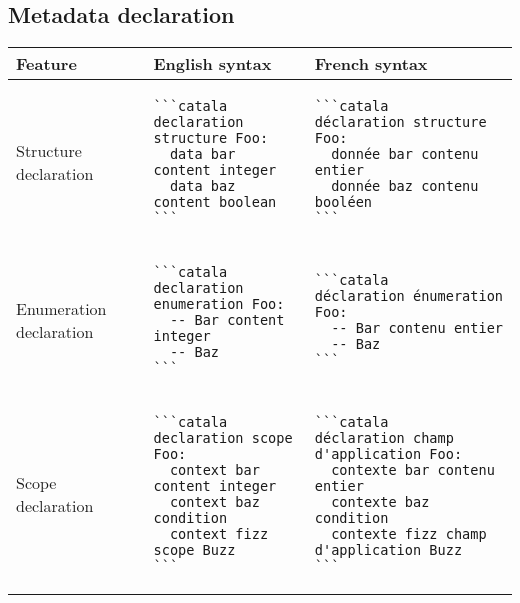 \documentclass[a3paper,landscape]{article}
\begin{document}
\begin{multicols*}{2}
\section*{Metadata declaration}
\begin{tabular}{p{}p{}p{}}
\toprule
Feature&English syntax&French syntax\\\midrule
Structure declaration&
\vspace*{-1.75em}
\begin{verbatim}
```catala
declaration structure Foo:
  data bar content integer
  data baz content boolean
```
\end{verbatim}
\vspace*{-1.75em}
&
\vspace*{-1.75em}
\begin{verbatim}
```catala
déclaration structure Foo:
  donnée bar contenu entier
  donnée baz contenu booléen
```
\end{verbatim}
\vspace*{-1.75em}
\\
Enumeration declaration&
\vspace*{-1.75em}
\begin{verbatim}
```catala
declaration enumeration Foo:
  -- Bar content integer
  -- Baz
```
\end{verbatim}
\vspace*{-1.75em}
&
\vspace*{-1.75em}
\begin{verbatim}
```catala
déclaration énumeration Foo:
  -- Bar contenu entier
  -- Baz
```
\end{verbatim}
\vspace*{-1.75em}\\
Scope declaration&
\vspace*{-1.75em}
\begin{verbatim}
```catala
declaration scope Foo:
  context bar content integer
  context baz condition
  context fizz scope Buzz
```
\end{verbatim}
\vspace*{-1.75em}
&
\vspace*{-1.75em}
\begin{verbatim}
```catala
déclaration champ d'application Foo:
  contexte bar contenu entier
  contexte baz condition
  contexte fizz champ d'application Buzz
```
\end{verbatim}
\vspace*{-1.75em}\\
\bottomrule
\end{tabular}












\end{multicols*}
\end{document}
